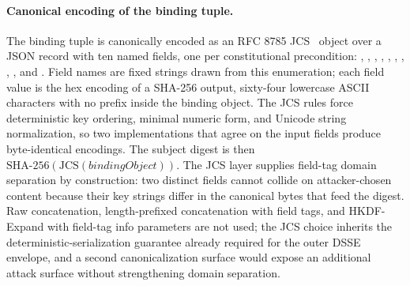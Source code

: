 \paragraph{Canonical encoding of the binding tuple.} The binding tuple is canonically encoded as an RFC 8785 JCS~\cite{rfc8785} object over a JSON record with ten named fields, one per constitutional precondition: , , , , , , , , , and . Field names are fixed strings drawn from this enumeration; each field value is the hex encoding of a SHA-256 output, sixty-four lowercase ASCII characters with no  prefix inside the binding object. The JCS rules force deterministic key ordering, minimal numeric form, and Unicode string normalization, so two implementations that agree on the input fields produce byte-identical encodings. The subject digest is then $\mathrm{SHA\text{-}256}(\mathrm{JCS}(\mathit{bindingObject}))$. The JCS layer supplies field-tag domain separation by construction: two distinct fields cannot collide on attacker-chosen content because their key strings differ in the canonical bytes that feed the digest. Raw concatenation, length-prefixed concatenation with field tags, and HKDF-Expand with field-tag info parameters are not used; the JCS choice inherits the deterministic-serialization guarantee already required for the outer DSSE envelope, and a second canonicalization surface would expose an additional attack surface without strengthening domain separation.

